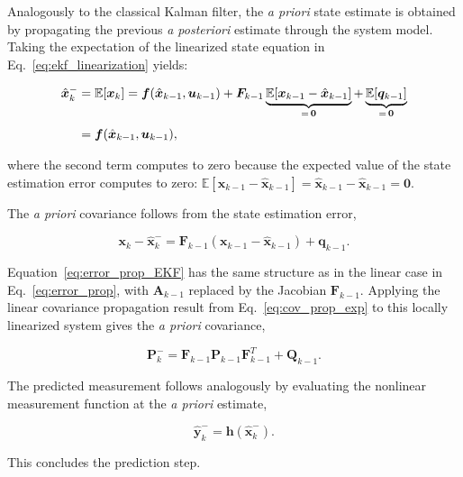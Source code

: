 Analogously to the classical Kalman filter, the \emph{a priori} state estimate is obtained by propagating the previous \emph{a posteriori} estimate through the system model. Taking the expectation of the linearized state equation in Eq.~\eqref{eq:ekf_linearization} yields:

\begin{align}
	\hat{\bm{x}}_{k}^-
	&=
	\mathbb{E}[\bm{x}_{k}]
	=
	\bm{f}(\hat{\bm{x}}_{k-1},\bm{u}_{k-1})
	+
	\bm{F}_{k-1}
	\underbrace{	
	\mathbb{E}[\bm{x}_{k-1}-\hat{\bm{x}}_{k-1}]}
	_{= \, \bm{0}}
	+
	\underbrace{
	\mathbb{E}[\bm{q}_{k-1}]}
	_{= \, \bm{0}}
	\notag \\[4pt]
	&=
	\bm{f}(\hat{\bm{x}}_{k-1},\bm{u}_{k-1}),
	\label{eq:mean_prop_ekf}
\end{align}

where the second term computes to zero because the expected value of the state estimation error computes to zero: $\mathbb{E}[\bm{x}_{k-1}-\hat{\bm{x}}_{k-1}] = \hat{\bm{x}}_{k-1} - \hat{\bm{x}}_{k-1} = \bm{0}$.

The \emph{a priori} covariance follows from the state estimation error,

\begin{equation}
	\bm{x}_{k} - \hat{\bm{x}}_{k}^- 
	= 
	\bm{F}_{k-1} \left( \bm{x}_{k-1} - \hat{\bm{x}}_{k-1} \right) + \bm{q}_{k-1}.
	\label{eq:error_prop_EKF}
\end{equation}

Equation~\eqref{eq:error_prop_EKF} has the same structure as in the linear case in Eq.~\eqref{eq:error_prop}, with $\bm{A}_{k-1}$ replaced by the Jacobian $\bm{F}_{k-1}$. Applying the linear covariance propagation result from Eq.~\eqref{eq:cov_prop_exp} to this locally linearized system gives the \emph{a priori} covariance,

\begin{equation}
	\bm{P}_k^- = \bm{F}_{k-1} \bm{P}_{k-1} \bm{F}_{k-1}^T + \bm{Q}_{k-1}.
	\label{eq:ekf_cov_prop}
\end{equation}

The predicted measurement follows analogously by evaluating the nonlinear measurement function at the \emph{a priori} estimate,

\begin{equation}
	\hat{\bm{y}}_k^- = \bm{h}(\hat{\bm{x}}_k^-).
	\label{eq:ekf_predicted_output}
\end{equation}

This concludes the prediction step.





